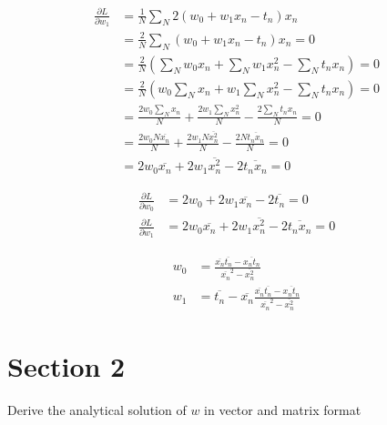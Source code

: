 \documentclass{report}
\begin{document}
\begin{equation} \label{eq2}
\begin{split}
\frac{\partial L}{\partial w_1} & = \frac{1}{N} \sum_{N} 2(w_0+w_1 x_n - t_n)x_n      \\
                                & = \frac{2}{N} \sum_{N} (w_0+w_1 x_n - t_n)x_n = 0 \\
                                & = \frac{2}{N} (\sum_{N}w_0 x_n + \sum_{N}w_1 x_n^2- \sum_{N}t_nx_n) = 0 \\
                                & = \frac{2}{N} (w_0\sum_{N} x_n + w_1\sum_{N} x_n^2- \sum_{N}t_nx_n) = 0 \\
                                & = \frac{2w_0\sum_{N}x_n}{N} + \frac{2w_1\sum_{N}x_n^2}{N}- \frac{2\sum_{N}t_nx_n}{N} = 0 \\
                                & = \frac{2w_0N\overline{x_n}}{N} + \frac{2w_1N\overline{x_n^2}}{N}- \frac{2N\overline{t_nx_n}}{N} = 0 \\
                                & = 2w_0\overline{x_n} + 2w_1\overline{x_n^2} - 2\overline{t_nx_n} = 0
\end{split}
\end{equation}

\begin{equation} \label{eq3}
\begin{split}
\frac{\partial L}{\partial w_0} & = 2w_0 + 2w_1\overline{x_n} - 2\overline{t_n} = 0 \\
\frac{\partial L}{\partial w_1} & = 2w_0\overline{x_n} + 2w_1\overline{x_n^2} - 2\overline{t_nx_n} = 0
\end{split}
\end{equation}

\begin{equation} \label{eq3}
\begin{split}
w_0 & = \frac{\overline{x_n}\overline{t_n} - \overline{x_nt_n}}{\overline{x_n}^2 - \overline{x_n^2}} \\
w_1 & = \overline{t_n} - \overline{x_n}\frac{\overline{x_n}\overline{t_n} - \overline{x_nt_n}}{\overline{x_n}^2 - \overline{x_n^2}}
\end{split}
\end{equation}

\chapter{Section 2}

Derive the analytical solution of $w$ in vector and matrix format
\end{document}
